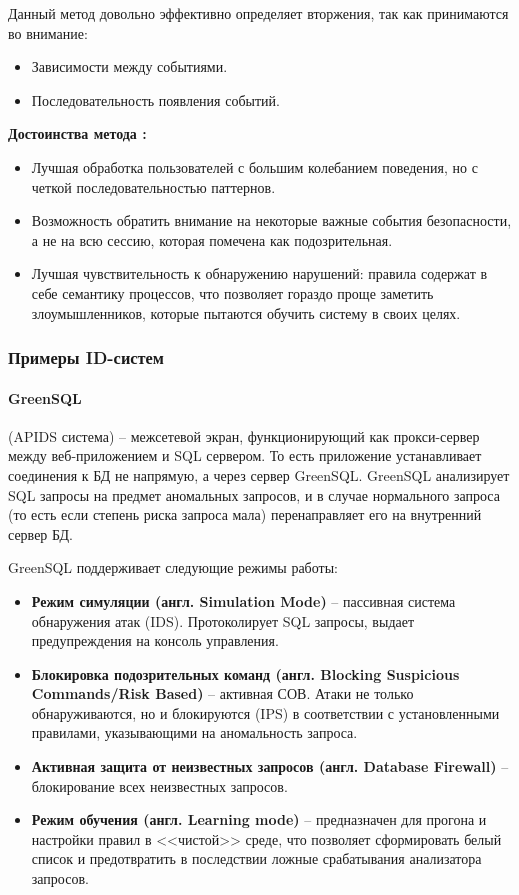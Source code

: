 Данный метод довольно эффективно определяет вторжения, так как принимаются во внимание:
\begin{itemize}
    \item Зависимости между событиями.
    \item Последовательность появления событий.
\end{itemize}

\textbf{Достоинства метода \autocite{IntrusionDetection}:}
\begin{itemize}
    \item Лучшая обработка пользователей с большим колебанием поведения, но с четкой
    последовательностью паттернов.
    \item Возможность обратить внимание на некоторые важные события безопасности, а не на всю сессию,
    которая помечена как подозрительная.
    \item Лучшая чувствительность к обнаружению нарушений: правила содержат в себе семантику процессов, что позволяет гораздо проще заметить злоумышленников, которые пытаются обучить систему в своих целях.
\end{itemize}

\subsubsection{Примеры ID-систем}


\paragraph*{GreenSQL} (APIDS система) -- межсетевой экран, функционирующий как
прокси-сервер между веб-приложением и SQL сервером. То есть приложение устанавливает
соединения к БД не напрямую, а через сервер GreenSQL. GreenSQL анализирует SQL запросы
на предмет аномальных запросов, и в случае нормального запроса (то есть если степень
риска запроса мала) перенаправляет его на внутренний сервер БД.

GreenSQL поддерживает следующие режимы работы:
\begin{itemize}
	\item \textbf{Режим симуляции (англ. Simulation Mode)} -- пассивная система обнаружения
	атак (IDS). Протоколирует SQL запросы, выдает предупреждения на консоль управления.

	\item \textbf{Блокировка подозрительных команд (англ. Blocking Suspicious Commands/Risk Based)} --
	активная СОВ. Атаки не только обнаруживаются, но и блокируются (IPS) в соответствии с
	установленными правилами, указывающими на аномальность запроса.

	\item \textbf{Активная защита от неизвестных запросов (англ. Database Firewall)} --
	блокирование всех неизвестных запросов.

	\item \textbf{Режим обучения (англ. Learning mode)} -- предназначен для прогона и
	настройки правил в <<чистой>> среде, что позволяет сформировать белый список и
	предотвратить в последствии ложные срабатывания анализатора запросов.
\end{itemize}

